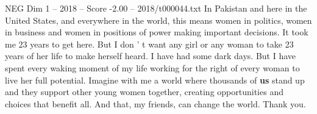\begin{textsample}{NEG Dim 1 – 2018 – Score -2.00 – 2018/t000044.txt}
In Pakistan and here in the United States, and everywhere in the world, this means women in politics, women in business and women in positions of power making important decisions.
It took me 23 years to get here.
But I don ' t want any girl or any woman to take 23 years of her life to make herself heard.
I have had some dark days.
But I have spent every waking moment of my life working for the right of every woman to live her full potential.
Imagine with me a world where thousands of \textbf{us} stand up and they support other young women together, creating opportunities and choices that benefit all.
And that, my friends, can change the world.
Thank you.

\end{textsample}
